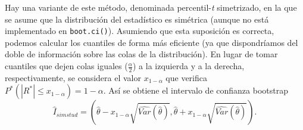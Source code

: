 \documentclass[
]{book}
\theoremstyle{break}
\theoremstyle{nonumberplain}
\begin{document}
Hay una variante de este método, denominada percentil-\emph{t} simetrizado, en la que se asume que la distribución del estadístico es simétrica (aunque no está implementado en \texttt{boot.ci()}).
Asumiendo que esta suposición es correcta, podemos calcular los cuantiles de forma más eficiente (ya que dispondríamos del doble de información sobre las colas de la distribución).
En lugar de tomar cuantiles que dejen colas iguales (\(\frac{\alpha }{2}\)) a la izquierda y a la derecha, respectivamente, se considera el valor \(x_{1-\alpha }\) que verifica \(P^{\ast}\left( \left\vert R^{\ast}\right\vert \leq x_{1-\alpha } \right) =1-\alpha\).
Así se obtiene el intervalo de confianza bootstrap
\[\hat{I}_{simstud}=\left( \hat{\theta} - x_{1-\alpha}\sqrt{\widehat{Var}(\hat \theta)},\hat{\theta} + x_{1-\alpha}\sqrt{\widehat{Var}(\hat \theta)} \right).\]
\end{document}
